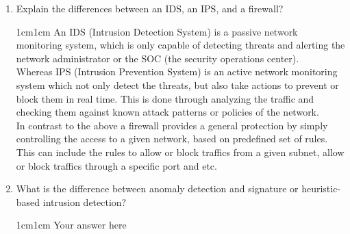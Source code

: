 \documentclass[11pt,letterpaper]{article}
\newenvironment{answer}{\em \color{blue} \begin{adjustwidth}{1cm}{1cm}}{\end{adjustwidth}}
\begin{document}
\begin{enumerate}
\begin{table}[htbp]
\begin{tabularx}{0.9\columnwidth}{|X|X|}
			\end{tabularx}
		\end{table}
		\pagebreak
		\item Explain the differences between an IDS, an IPS, and a firewall?
		
		\begin{answer}
			 An IDS (Intrusion Detection System)  is a passive network monitoring system, which is only capable of detecting threats and alerting the network administrator or the SOC (the security operations center).\\
			 
			 Whereas IPS (Intrusion Prevention System) is an active network monitoring system which not only detect the threats, but also take actions to prevent or block them in real time. This is done through analyzing the traffic and checking them against known attack patterns or policies of the network.\\
			 
			 In contrast to the above a firewall provides a general protection by simply controlling the access to a given network, based on predefined set of rules. This can include the rules to allow or block traffics from a given subnet, allow or block traffics through a specific port and etc.
		\end{answer}
		
		\item What is the difference between anomaly detection and signature or heuristic-based intrusion detection?
		
		\begin{answer}
			Your answer here
		\end{answer}
		
	\end{enumerate}
	
\end{document}
